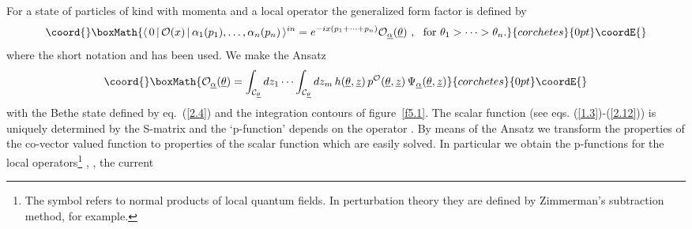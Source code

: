 \documentclass[a4paper,a4paper]{article}
\begin{document}
For a state of \coordHE{} particles of kind \coordHE{} with momenta \coordHE{} and a local operator \coordHE{} the
generalized form factor is defined by 
\[\coord{}\boxMath{
\langle \,0\,|\,\mathcal{O}(x)\,|\,\alpha _{1}(p_{1}),\dots ,\alpha
_{n}(p_{n})\,\rangle ^{in}=e^{-ix(p_{1}+\cdots +p_{n})}\mathcal{O}_{%
\underline{\alpha }}(\underline{\theta })~,~~\mathrm{for}~\theta _{1}>\dots
>\theta _{n}. 
}{corchetes}{0pt}\coordE{}\]
where the short notation \coordHE{} and \coordHE{} has been
used. We make the Ansatz 
\[\coord{}\boxMath{
\mathcal{O}_{\underline{\alpha }}(\underline{\theta })=\int_{\mathcal{C}_{%
\underline{\theta }}}dz_{1}\cdots \int_{\mathcal{C}_{\underline{\theta }%
}}dz_{m}\,h(\underline{\theta },{\underline{z}})\,p^{\mathcal{O}}(\underline{%
\theta },{\underline{z}})\,\Psi _{\underline{\alpha }}(\underline{\theta },{%
\underline{z}}) 
}{corchetes}{0pt}\coordE{}\]
with the Bethe state \coordHE{} defined by eq.~(\ref{2.4}) and the integration contours \coordHE{} of figure~\ref{f5.1}. The scalar function 
\coordHE{} (see eqs. (\ref{1.3})-(\ref{2.12}))
is uniquely determined by the S-matrix and the `p-function' \coordHE{} depends on the operator \coordHE{}. By means of the Ansatz we transform the properties \coordHE{} of the
co-vector valued function \coordHE{} to properties \coordHE{} of the scalar
function \coordHE{} which are
easily solved. In particular we obtain the p-functions for the local
operators\footnote{%
The symbol \coordHE{} refers to normal products of local quantum fields.
In perturbation theory they are defined by Zimmerman's \cite{Zi} subtraction
method, for example.} \coordHE{}, \coordHE{}, the current \coordHE{}%
\end{document}
